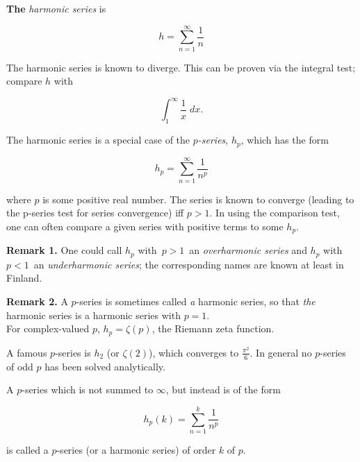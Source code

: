 \documentclass[12pt]{article}
\begin{document}
\textbf{The} \emph{harmonic series} is 

 $$ h = \sum_{n=1}^\infty \frac{1}{n} $$

The harmonic series is known to diverge.  This can be proven via the integral test; compare $h$ with 

 $$ \int_{1}^\infty \frac{1}{x} \; dx. $$ 

The harmonic series is a special case of the \emph{$p$-series}, $h_p$, which has the form

$$ h_p = \sum_{n=1}^\infty \frac{1}{n^p} $$

where $p$ is some positive real number.  The series is known to converge (leading to the p-series test for series convergence) iff $p > 1$.  In using the comparison test, one can often compare a given series with positive terms to some $h_p$.

\textbf{Remark 1.}  One could call $h_p$ with\, $p > 1$\, an {\em overharmonic series} and $h_p$ with\, $p < 1$\, an {\em underharmonic series}; the corresponding names are known at least in Finland.

\textbf{Remark 2.}  A $p$-series is sometimes called \emph{a} harmonic series, so that \emph{the} harmonic series is a harmonic series with $p=1$.\\

For complex-valued $p$, $h_p = \zeta(p)$, the Riemann zeta function.

A famous $p$-series is $h_2$ (or $\zeta(2)$), which converges to $\frac{\pi^2}{6}$.  In general no $p$-series of odd $p$ has been solved analytically.

A $p$-series which is not summed to $\infty$, but instead is of the form

$$ h_p(k) = \sum_{n=1}^k \frac{1}{n^p} $$

is called a $p$-series (or a harmonic series) of order $k$ of $p$.
\end{document}
